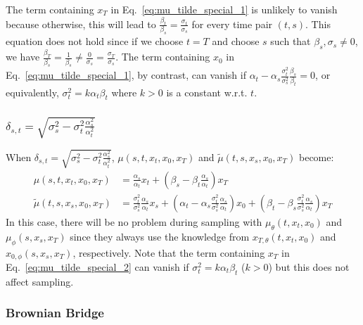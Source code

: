 The term containing $x_{T}$ in Eq.~\ref{eq:mu_tilde_special_1}
is unlikely to vanish because otherwise, this will lead to $\frac{\beta_{t}}{\beta_{s}}=\frac{\sigma_{t}}{\sigma_{s}}$
for every time pair $\left(t,s\right)$. This equation does not hold
since if we choose $t=T$ and choose $s$ such that $\beta_{s},\sigma_{s}\neq0$,
we have $\frac{\beta_{T}}{\beta_{s}}=\frac{1}{\beta_{s}}\neq\frac{0}{\sigma_{s}}=\frac{\sigma_{T}}{\sigma_{s}}$.
The term containing $x_{0}$ in Eq.~\ref{eq:mu_tilde_special_1},
by contrast, can vanish if $\alpha_{t}-\alpha_{s}\frac{\sigma_{t}^{2}}{\sigma_{s}^{2}}\frac{\beta_{s}}{\beta_{t}}=0$,
or equivalently, $\sigma_{t}^{2}=k\alpha_{t}\beta_{t}$ where $k>0$
is a constant w.r.t. $t$.

\subsubsection{$\delta_{s,t}=\sqrt{\sigma_{s}^{2}-\sigma_{t}^{2}\frac{\alpha_{s}^{2}}{\alpha_{t}^{2}}}$}

When $\delta_{s,t}=\sqrt{\sigma_{s}^{2}-\sigma_{t}^{2}\frac{\alpha_{s}^{2}}{\alpha_{t}^{2}}}$,
$\mu\left(s,t,x_{t},x_{0},x_{T}\right)$ and $\tilde{\mu}\left(t,s,x_{s},x_{0},x_{T}\right)$
become:
\begin{align}
\mu\left(s,t,x_{t},x_{0},x_{T}\right) & =\frac{\alpha_{s}}{\alpha_{t}}x_{t}+\left(\beta_{s}-\beta_{t}\frac{\alpha_{s}}{\alpha_{t}}\right)x_{T}\label{eq:mu_special_2}\\
\tilde{\mu}\left(t,s,x_{s},x_{0},x_{T}\right) & =\frac{\sigma_{t}^{2}}{\sigma_{s}^{2}}\frac{\alpha_{s}}{\alpha_{t}}x_{s}+\left(\alpha_{t}-\alpha_{s}\frac{\sigma_{t}^{2}}{\sigma_{s}^{2}}\frac{\alpha_{s}}{\alpha_{t}}\right)x_{0}+\left(\beta_{t}-\beta_{s}\frac{\sigma_{t}^{2}}{\sigma_{s}^{2}}\frac{\alpha_{s}}{\alpha_{t}}\right)x_{T}\label{eq:mu_tilde_special_2}
\end{align}
In this case, there will be no problem during sampling with $\mu_{\theta}\left(t,x_{t},x_{0}\right)$
and $\mu_{\phi}\left(s,x_{s},x_{T}\right)$ since they always use
the knowledge from $x_{T,\theta}\left(t,x_{t},x_{0}\right)$ and $x_{0,\phi}\left(s,x_{s},x_{T}\right)$,
respectively. Note that the term containing $x_{T}$ in Eq.~\ref{eq:mu_tilde_special_2}
can vanish if $\sigma_{t}^{2}=k\alpha_{t}\beta_{t}$ ($k>0$) but
this does not affect sampling.

\subsubsection{Brownian Bridge\label{subsec:Brownian-Bridge_settings}}

